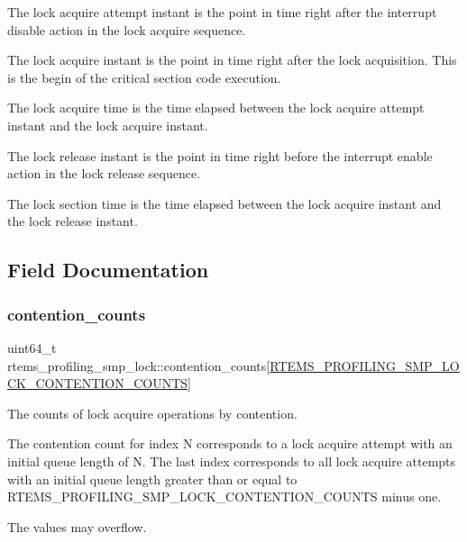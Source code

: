 The lock acquire attempt instant is the point in time right after the interrupt disable action in the lock acquire sequence.

The lock acquire instant is the point in time right after the lock acquisition. This is the begin of the critical section code execution.

The lock acquire time is the time elapsed between the lock acquire attempt instant and the lock acquire instant.

The lock release instant is the point in time right before the interrupt enable action in the lock release sequence.

The lock section time is the time elapsed between the lock acquire instant and the lock release instant. 

\subsection{Field Documentation}
\mbox{\label{structrtems__profiling__smp__lock_af113eb6e40d7caf6cf0c40d4e9446c21}} 
\subsubsection{\texorpdfstring{contention\_counts}{contention\_counts}}
{\footnotesize\ttfamily uint64\+\_\+t rtems\+\_\+profiling\+\_\+smp\+\_\+lock\+::contention\+\_\+counts\mbox{[}\mbox{\hyperlink{group__Profiling_gaa982fd0b6f3e7e29927a4efa146eb7ad}{R\+T\+E\+M\+S\+\_\+\+P\+R\+O\+F\+I\+L\+I\+N\+G\+\_\+\+S\+M\+P\+\_\+\+L\+O\+C\+K\+\_\+\+C\+O\+N\+T\+E\+N\+T\+I\+O\+N\+\_\+\+C\+O\+U\+N\+TS}}\mbox{]}}



The counts of lock acquire operations by contention. 

The contention count for index N corresponds to a lock acquire attempt with an initial queue length of N. The last index corresponds to all lock acquire attempts with an initial queue length greater than or equal to R\+T\+E\+M\+S\+\_\+\+P\+R\+O\+F\+I\+L\+I\+N\+G\+\_\+\+S\+M\+P\+\_\+\+L\+O\+C\+K\+\_\+\+C\+O\+N\+T\+E\+N\+T\+I\+O\+N\+\_\+\+C\+O\+U\+N\+TS minus one.

The values may overflow. \mbox{\label{structrtems__profiling__smp__lock_a74e0ea0fae764222e7107c522f2bc1b6}} 
